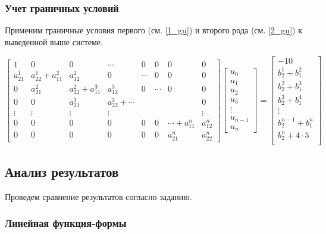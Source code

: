 \subsubsection{Учет граничных условий}

Применим граничные условия первого (см. \ref{1_gu}) и  второго  рода (см. \ref{2_gu}) к выведенной выше системе.

$$
\begin{bmatrix}
1 & 0 &   0 & \cdots & 0 & 0 & 0  & 0\\
a_{21}^1 & a_{22}^1+a_{11}^2 & a_{12}^2  & 0 & \cdots & 0 & 0  & 0\\
0 & a_{21}^2 & a_{22}^2+a_{11}^3  &  a_{12}^3  & 0 & \cdots & 0  & 0\\
0 & 0 & a_{21}^3  & a_{22}^3+ \cdots  &  & &   & 0\\
\vdots & \vdots & \vdots & \vdots &  &  &   & \vdots\\
0 & 0 & 0 & 0 &  0 & 0 & \cdots+a_{11}^n  & a_{12}^n\\
0 & 0 & 0 & 0 &  0 & 0 & a_{21}^n  & a_{22}^n
\end{bmatrix}
\begin{bmatrix}
u_0 \\
u_1 \\
u_2\\
u_3\\
\vdots\\
u_{n-1}\\
u_n
\end{bmatrix} =
\begin{bmatrix}
 -10   \\
b_2^1+b_1^2\\
b_2^2+b_1^3\\
b_2^3+b_1^4\\
\vdots\\
b_2^{n-1}+b_1^n\\
 b_2^n   +4  \cdot 5   \\
\end{bmatrix}
$$

\subsection{Анализ результатов}

Проведем сравнение результатов согласно заданию.

\subsubsection{Линейная функция-формы}


